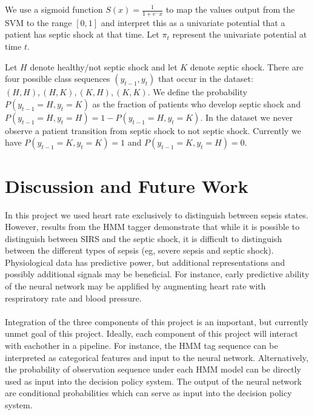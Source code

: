 \documentclass[12pt,solutions]{article}
\begin{document}
We use a sigmoid function $S(x) = \frac{1}{1+e^-x}$ to map the values output from the SVM to the range $[0,1]$ and interpret this as a univariate potential that a patient has septic shock at that time. Let $\pi_t$ represent the univariate potential at time $t$.

Let $H$ denote healthy/not septic shock and let $K$ denote septic shock. There are four possible class sequences $(y_{t-1},y_t)$ that occur in the dataset: $(H,H), (H,K), (K,H), (K,K)$. We define the probability $P(y_{t-1}=H, y_t=K)$ as the fraction of patients who develop septic shock and $P(y_{t-1}=H, y_t=H) = 1 - P(y_{t-1}=H, y_t=K)$. In the dataset we never observe a patient transition from septic shock to not septic shock. Currently we have $P(y_{t-1}=K, y_t=K) = 1$ and  $P(y_{t-1}=K, y_t=H) = 0$.

\section{Discussion and Future Work}

In this project we used heart rate exclusively to distinguish between sepsis states. However, results from the HMM tagger demonstrate
that while it is possible to distinguish between SIRS and the septic shock, it is difficult to distinguish between the different types
of sepsis (eg, severe sepsis and septic shock). Physiological data has predictive power, but additional representations and possibly additional signals may be beneficial. For instance, early predictive ability of the neural network may be applified by augmenting  heart rate with respriratory rate and blood pressure.
\\
\\
Integration of the three components of this project is an important, but currently unmet goal of this project. Ideally, each component of
this project will interact with eachother in a pipeline. For instance, the HMM tag sequence can be interpreted as categorical features and 
input to the neural network. Alternatively, the probability of observation sequence under each HMM model can be directly used as input into
the decision policy system. The output of the neural network are conditional probabilities which can serve as input into the decision policy 
system.




\end{document}

